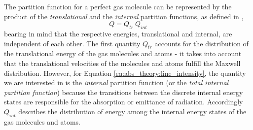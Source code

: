 The partition function for a perfect gas molecule can be represented
by the product of the {\it{translational}\nocorr} and the
{\it{internal}\nocorr} partition functions, as defined in \citet{herzberg:45},
\begin{equation}\label{eq:abs_theory:partition_f_general}
 Q  =  Q_{tr}~Q_{int}
\end{equation}
bearing in mind that the respective energies, translational and
internal, are independent of each other. The first quantity $Q_{tr}$ accounts
for the distribution of the translational energy of the gas molecules and atoms
- it takes into account that the translational velocities of the
molecules and atoms fulfill the Maxwell distribution. However, for Equation
\ref{eq:abs_theory:line_intensity}, the quantity we are interested in
is the {\it{internal}\nocorr} partition function (or the {\it{total internal
partition function}\nocorr}) because the transitions between the discrete
internal energy states are responsible for the absorption or emittance
of radiation. Accordingly $Q_{int}$ describes the distribution of energy among
the internal energy states of the gas molecules and atoms.


